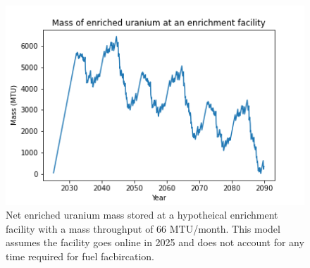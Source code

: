 \begin{figure}
    \centering
    \includegraphics[scale=0.5]{../figures/potential_uranium_stockpile.png}
    \caption{Net enriched uranium mass stored at a hypotheical enrichment facility with 
    a mass throughput of 66 MTU/month. This model assumes the facility goes online in 2025
    and does not account for any time required for fuel facbircation.}
    \label{fig:enrich_storage}
\end{figure}